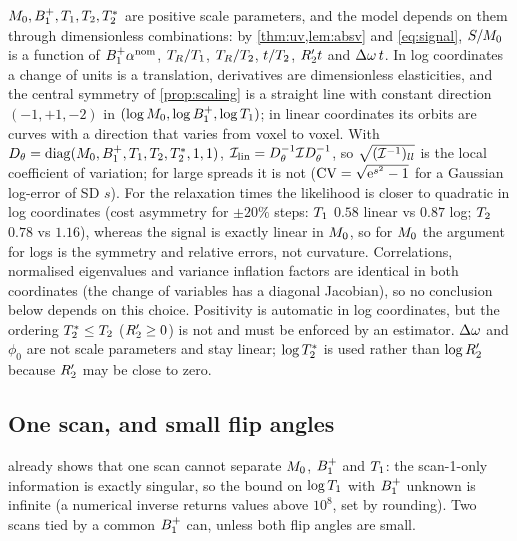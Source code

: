 $M_0,B_1^{+},T_1,T_2,T_2^{*}$ are positive scale parameters, and the model depends on them
through dimensionless combinations: by \cref{thm:uv,lem:absv} and \eqref{eq:signal},
$S/M_0$ is a function of $B_1^{+}\alpha^{\rm nom}$, $T_R/T_1$, $T_R/T_2$, $t/T_2$, $R_2' t$ and
$\Delta\omega\,t$. In log coordinates a change of units is a translation, derivatives are
dimensionless elasticities, and the central symmetry of \cref{prop:scaling} is a straight
line with constant direction $(-1,+1,-2)$ in $(\log M_0,\log B_1^{+},\log T_1)$; in linear
coordinates its orbits are curves with a direction that varies from voxel to voxel. With
$D_\theta=\mathrm{diag}(M_0,B_1^{+},T_1,T_2,T_2^{*},1,1)$, $\mathcal{I}_{\rm lin}=D_\theta^{-1}\mathcal{I}
D_\theta^{-1}$, so $\sqrt{(\mathcal{I}^{-1})_{ll}}$ is the local coefficient of variation; for large
spreads it is not ($\mathrm{CV}=\sqrt{\mathrm{e}^{s^2}-1}$ for a Gaussian log-error of SD $s$).
For the relaxation times the likelihood is closer to quadratic in log coordinates (cost
asymmetry for $\pm20\%$ steps: $T_1$ $0.58$ linear vs $0.87$ log; $T_2$ $0.78$ vs $1.16$),
whereas the signal is exactly linear in $M_0$, so for $M_0$ the argument for logs is the
symmetry and relative errors, not curvature. Correlations, normalised eigenvalues and
variance inflation factors are identical in both coordinates (the change of variables has a
diagonal Jacobian), so no conclusion below depends on this choice. Positivity is automatic
in log coordinates, but the ordering $T_2^{*}\le T_2$ ($R_2'\ge0$) is not and must be enforced
by an estimator. $\Delta\omega$ and $\phi_0$ are not scale parameters and stay linear; $\log T_2^{*}$ is
used rather than $\log R_2'$ because $R_2'$ may be close to zero.

\subsection{One scan, and small flip angles}

 already shows that one scan cannot separate $M_0$, $B_1^{+}$ and $T_1$:
the scan-1-only information is exactly singular, so the bound on $\log T_1$ with $B_1^{+}$ unknown is
infinite (a numerical inverse returns values above $10^8$, set by rounding). Two scans tied by a
common $B_1^{+}$ can, unless both flip angles are small.


